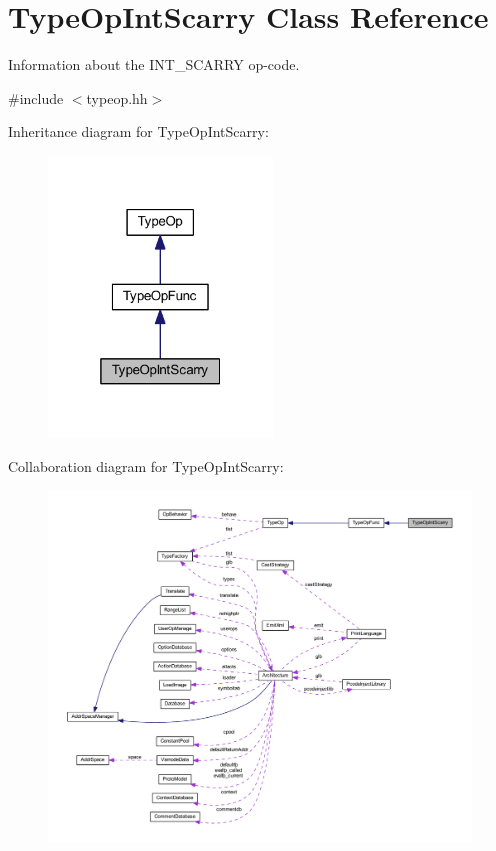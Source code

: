 \hypertarget{class_type_op_int_scarry}{}\section{Type\+Op\+Int\+Scarry Class Reference}
\label{class_type_op_int_scarry}


Information about the I\+N\+T\+\_\+\+S\+C\+A\+R\+RY op-\/code.  




{\ttfamily \#include $<$typeop.\+hh$>$}



Inheritance diagram for Type\+Op\+Int\+Scarry\+:
\nopagebreak
\begin{figure}[H]
\begin{center}
\leavevmode
\includegraphics[width=169pt]{class_type_op_int_scarry__inherit__graph}
\end{center}
\end{figure}


Collaboration diagram for Type\+Op\+Int\+Scarry\+:
\nopagebreak
\begin{figure}[H]
\begin{center}
\leavevmode
\includegraphics[width=350pt]{class_type_op_int_scarry__coll__graph}
\end{center}
\end{figure}
